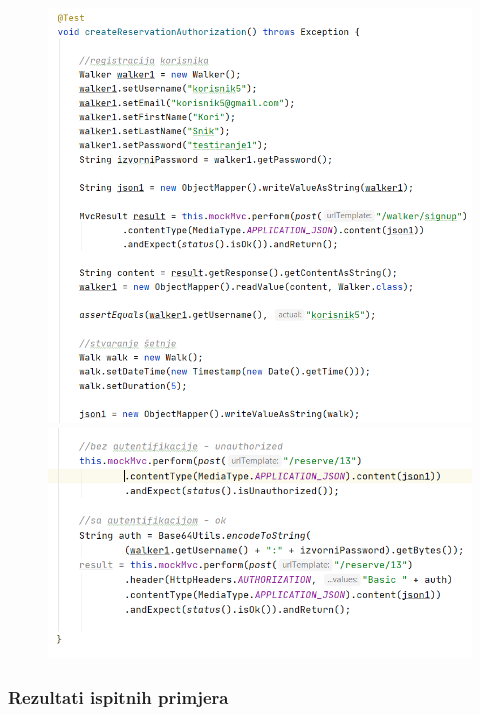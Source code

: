 			
			\begin{figure}[H]
				\hspace*{-0.18in}
				\includegraphics[scale=0.75]{slike/walker4.1.PNG}
				\hspace*{-0.4in}
				\includegraphics[scale=0.75]{slike/walker4.2.PNG} %
				\centering
			\end{figure}
		
		
			\subsubsection{Rezultati ispitnih primjera }
			
